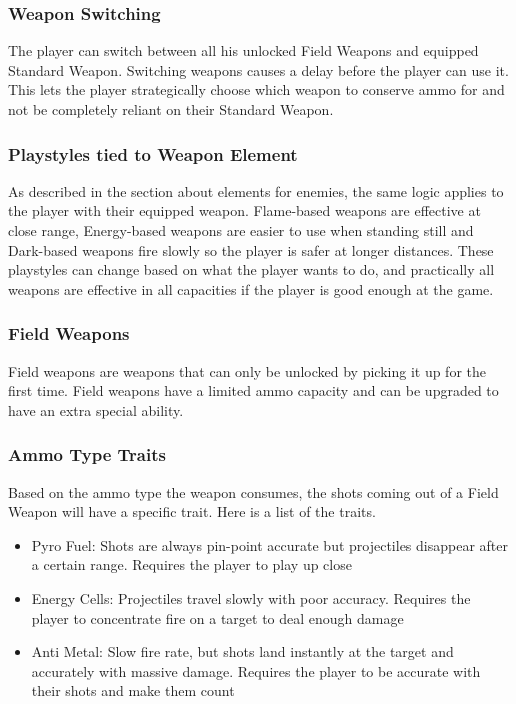 \documentclass[12pt]{article}
\begin{document}
\subsubsection{Weapon Switching}

The player can switch between all his unlocked Field Weapons and equipped Standard Weapon. Switching weapons causes a delay before the player can use it. This lets the player strategically choose which weapon to conserve ammo for and not be completely reliant on their Standard Weapon. 

\subsubsection{Playstyles tied to Weapon Element}

As described in the section about elements for enemies, the same logic applies to the player with their equipped weapon. Flame-based  weapons are effective at close range, Energy-based weapons are easier to use when standing still and Dark-based weapons fire slowly so the player is safer at longer distances. These playstyles can change based on what the player wants to do, and practically all weapons are effective in all capacities if the player is good enough at the game. 

\subsubsection{Field Weapons}

Field weapons are weapons that can only be unlocked by picking it up for the first time. Field weapons have a limited ammo capacity and can be upgraded to have an extra special ability.

\subsubsection{Ammo Type Traits}

Based on the ammo type the weapon consumes, the shots coming out of a Field Weapon will have a specific trait. Here is a list of the traits. 

\begin{itemize}
	\item Pyro Fuel: Shots are always pin-point accurate but projectiles disappear after a certain range. Requires the player to play up close
	\item Energy Cells: Projectiles travel slowly with poor accuracy. Requires the player to concentrate fire on a target to deal enough damage
	\item Anti Metal: Slow fire rate, but shots land instantly at the target and accurately with massive damage. Requires the player to be accurate with their shots and make them count
\end{itemize}
\end{document}
